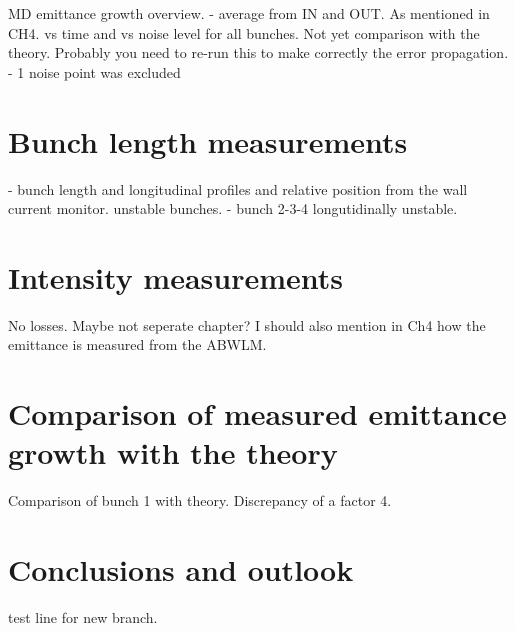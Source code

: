 MD emittance growth overview. 
    - average from IN and OUT. As mentioned in CH4. vs time and vs noise level for all bunches. Not yet comparison with the theory. Probably you need to re-run this to make correctly the error propagation. 
    - 1 noise point was excluded
 


\section{Bunch length measurements}\label{sec:bunch_length_measurements_2018}
    - bunch length and longitudinal profiles and relative position from the wall current monitor.  unstable bunches.
    - bunch 2-3-4 longutidinally unstable.
 
\section{Intensity measurements}\label{sec:intensity_measurements_2018}
No losses. Maybe not seperate chapter?
I should also mention in Ch4 how the emittance is measured from the ABWLM.

\section{Comparison of measured emittance growth with the theory}\label{sec:meas_2018_vs_theory}

Comparison of bunch 1 with theory. Discrepancy of a factor 4.


 \section{Conclusions and outlook}\label{sec:MD2018_summary}



 test line for new branch.